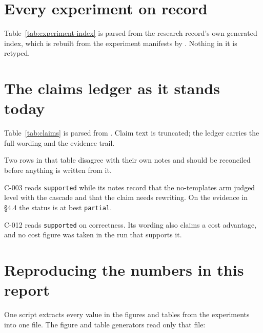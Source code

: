 \section{Every experiment on record}

Table~\ref{tab:experiment-index} is parsed from the research record's own
generated index, which is rebuilt from the experiment manifests by
. Nothing in it is retyped.

\begin{table}[htbp]
\caption{The nineteen experiments this report draws on. A superseded entry is
kept deliberately, so that a dead end is walked into once rather than twice.
Produced by .}
\label{tab:experiment-index}
\centering\scriptsize

\end{table}

\section{The claims ledger as it stands today}

Table~\ref{tab:claims} is parsed from . Claim
text is truncated; the ledger carries the full wording and the evidence trail.

\begin{table}[htbp]
\caption{Claim status at 2026-08-20, straight from the ledger. Produced by
.}
\label{tab:claims}
\centering\scriptsize

\end{table}

Two rows in that table disagree with their own notes and should be reconciled
before anything is written from it.

C-003 reads \texttt{supported} while its notes record that the no-templates arm
judged level with the cascade and that the claim needs rewriting. On the
evidence in \S4.4 the status is at best \texttt{partial}.

C-012 reads \texttt{supported} on correctness. Its wording also claims a cost
advantage, and no cost figure was taken in the run that supports it.

\section{Reproducing the numbers in this report}

One script extracts every value in the figures and tables from the experiments
into one file. The figure and table generators read only that file:

